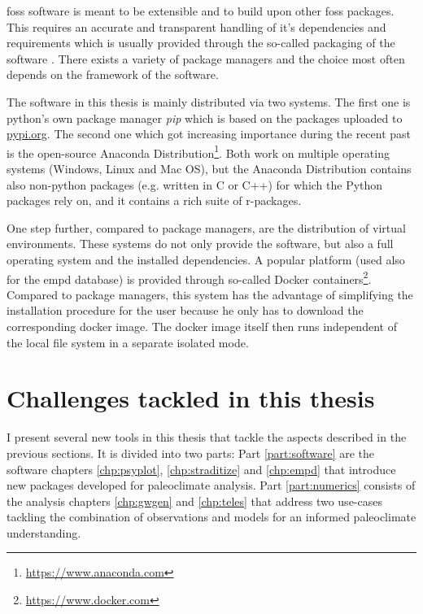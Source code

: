 \begin{refsection}
\gls{foss} software is meant to be extensible and to build upon other \gls{foss} packages. This requires an accurate and transparent handling of it's dependencies and requirements which is usually provided through the so-called packaging of the software \citep[e.g.][]{Torborg2016}. There exists a variety of package managers and the choice most often depends on the framework of the software. 

The software in this thesis is mainly distributed via two systems. The first one is python's own package manager \textit{pip} which is based on the packages uploaded to \href{https://pypi.org/}{pypi.org}. The second one which got increasing importance during the recent past is the open-source Anaconda Distribution\footnote{\url{https://www.anaconda.com}}. Both work on multiple operating systems (Windows, Linux and Mac OS), but the Anaconda Distribution contains also non-python packages (e.g. written in C or C++) for which the Python packages rely on, and it contains a rich suite of r-packages.

One step further, compared to package managers, are the distribution of virtual environments. These systems do not only provide the software, but also a full operating system and the installed dependencies. A popular platform (used also for the \gls{empd} database) is provided through so-called Docker containers\footnote{\url{https://www.docker.com}}. Compared to package managers, this system has the advantage of simplifying the installation procedure for the user because he only has to download the corresponding docker image. The docker image itself then runs independent of the local file system in a separate isolated mode.



\section{Challenges tackled in this thesis} \label{sec:intro-thesis-overview}

I present several new tools in this thesis that tackle the aspects described in the previous sections. It is divided into two parts: Part \ref{part:software} are the software chapters \ref{chp:psyplot}, \ref{chp:straditize} and \ref{chp:empd} that introduce new packages developed for paleoclimate analysis. Part \ref{part:numerics} consists of the analysis chapters \ref{chp:gwgen} and \ref{chp:teles} that address two use-cases tackling the combination of observations and models for an informed paleoclimate understanding.


\end{refsection}

